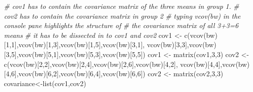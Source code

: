 \documentclass[
]{book}
\newenvironment{Shaded}{\begin{snugshade}}{\end{snugshade}}
\newcommand{\CommentTok}[1]{\textcolor[rgb]{0.56,0.35,0.01}{\textit{#1}}}
\newcommand{\DecValTok}[1]{\textcolor[rgb]{0.00,0.00,0.81}{#1}}
\newcommand{\FunctionTok}[1]{\textcolor[rgb]{0.00,0.00,0.00}{#1}}
\newcommand{\NormalTok}[1]{#1}
\newcommand{\OtherTok}[1]{\textcolor[rgb]{0.56,0.35,0.01}{#1}}
\begin{document}
\begin{Shaded}
\begin{Highlighting}[]
\CommentTok{\# cov1 has to contain the covariance matrix of the three means in group 1.}
\CommentTok{\# cov2 has to contain the covariance matrix in group 2}
\CommentTok{\# typing vcov(bw) in the console pane highlights the structure of}
\CommentTok{\# the covariance matrix of all 3+3=6 means}
\CommentTok{\# it has to be dissected in to cov1 and cov2}
\NormalTok{cov1 }\OtherTok{\textless{}{-}} \FunctionTok{c}\NormalTok{(}\FunctionTok{vcov}\NormalTok{(bw)[}\DecValTok{1}\NormalTok{,}\DecValTok{1}\NormalTok{],}\FunctionTok{vcov}\NormalTok{(bw)[}\DecValTok{1}\NormalTok{,}\DecValTok{3}\NormalTok{],}\FunctionTok{vcov}\NormalTok{(bw)[}\DecValTok{1}\NormalTok{,}\DecValTok{5}\NormalTok{],}\FunctionTok{vcov}\NormalTok{(bw)[}\DecValTok{3}\NormalTok{,}\DecValTok{1}\NormalTok{],}
\FunctionTok{vcov}\NormalTok{(bw)[}\DecValTok{3}\NormalTok{,}\DecValTok{3}\NormalTok{],}\FunctionTok{vcov}\NormalTok{(bw)[}\DecValTok{3}\NormalTok{,}\DecValTok{5}\NormalTok{],}\FunctionTok{vcov}\NormalTok{(bw)[}\DecValTok{5}\NormalTok{,}\DecValTok{1}\NormalTok{],}\FunctionTok{vcov}\NormalTok{(bw)[}\DecValTok{5}\NormalTok{,}\DecValTok{3}\NormalTok{],}\FunctionTok{vcov}\NormalTok{(bw)[}\DecValTok{5}\NormalTok{,}\DecValTok{5}\NormalTok{])}
\NormalTok{cov1 }\OtherTok{\textless{}{-}} \FunctionTok{matrix}\NormalTok{(cov1,}\DecValTok{3}\NormalTok{,}\DecValTok{3}\NormalTok{)}
\NormalTok{cov2 }\OtherTok{\textless{}{-}} \FunctionTok{c}\NormalTok{(}\FunctionTok{vcov}\NormalTok{(bw)[}\DecValTok{2}\NormalTok{,}\DecValTok{2}\NormalTok{],}\FunctionTok{vcov}\NormalTok{(bw)[}\DecValTok{2}\NormalTok{,}\DecValTok{4}\NormalTok{],}\FunctionTok{vcov}\NormalTok{(bw)[}\DecValTok{2}\NormalTok{,}\DecValTok{6}\NormalTok{],}\FunctionTok{vcov}\NormalTok{(bw)[}\DecValTok{4}\NormalTok{,}\DecValTok{2}\NormalTok{],}
\FunctionTok{vcov}\NormalTok{(bw)[}\DecValTok{4}\NormalTok{,}\DecValTok{4}\NormalTok{],}\FunctionTok{vcov}\NormalTok{(bw)[}\DecValTok{4}\NormalTok{,}\DecValTok{6}\NormalTok{],}\FunctionTok{vcov}\NormalTok{(bw)[}\DecValTok{6}\NormalTok{,}\DecValTok{2}\NormalTok{],}\FunctionTok{vcov}\NormalTok{(bw)[}\DecValTok{6}\NormalTok{,}\DecValTok{4}\NormalTok{],}\FunctionTok{vcov}\NormalTok{(bw)[}\DecValTok{6}\NormalTok{,}\DecValTok{6}\NormalTok{])}
\NormalTok{cov2 }\OtherTok{\textless{}{-}} \FunctionTok{matrix}\NormalTok{(cov2,}\DecValTok{3}\NormalTok{,}\DecValTok{3}\NormalTok{)}
\NormalTok{covariance}\OtherTok{\textless{}{-}}\FunctionTok{list}\NormalTok{(cov1,cov2)}
\end{Highlighting}
\end{Shaded}
\end{document}
